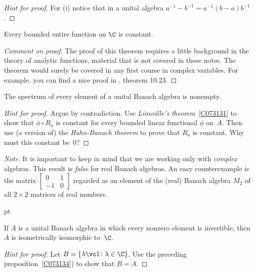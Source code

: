 \begin{proof}[\emph{Hint for proof}] For (i) notice that in a unital algebra $a^{-1} - b^{-1}
= a^{-1}(b - a)b^{-1}$.   \ns
\end{proof}

\begin{thm}[Liouville]\label{C073131} Every bounded entire function on $\C$ is constant.
\end{thm}

\begin{proof}[\emph{Comment on proof}] The proof of this theorem requires a little background
in the theory of analytic functions, material that is not covered in these notes.  The
theorem would surely be covered in any first course in complex variables.  For example, you can find a
nice proof in \cite{Rudin:1987}, theorem 10.23.   \ns
\end{proof}

\begin{prop}\label{C073134} The spectrum of every element of a unital Banach algebra is nonempty.
\end{prop}

\begin{proof}[\emph{Hint for proof}] Argue by contradiction.  Use \emph{Liouville's theorem}~\ref{C073131}
to show that $\phi \circ R_a$ is constant for every bounded linear functional $\phi$ on~$A$. Then use
(a version of) the \emph{Hahn-Banach theorem} to prove that $R_a$ is constant.  Why must this constant be~$0$?   \ns
\end{proof}

\noindent\emph{Note.} It is important to keep in mind that we are working only with
\emph{complex} algebras.  This result is \emph{false} for real Banach algebras.  An easy
counterexample is the matrix $\begin{bmatrix}0 & 1 \\ -1 & 0 \end{bmatrix}$ regarded as
an element of the (real) Banach algebra $M_2$ of all $2 \times 2$ matrices of real
numbers.

  pt

\begin{thm}\label{C073141} If $A$ is a unital Banach algebra in which every
nonzero element is invertible, then $A$ is isometrically isomorphic to~$\C$.
\end{thm}

\begin{proof}[\emph{Hint for proof}] Let $B = \{ \lambda\vc 1\colon \lambda \in \C\}$. Use
the preceding proposition~\ref{C073134}) to show that $B = A$.    \ns
\end{proof}


